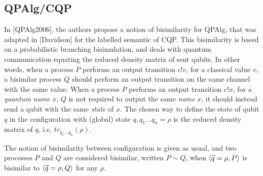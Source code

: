 \subsection{QPAlg/CQP}\label{lalire_bisimulation}

In [QPAlg2006], the authors propose a notion of bisimilarity for QPAlg, that was adapted in [Davidson] for the labelled semantic of CQP. This bisimilarity is based on a probabilistic branching bisimulation, and deals with quantum communication equating the reduced density matrix of sent qubits. In other words, when a process $P$ performs an output transition $c!v$, for a classical value $v$, a bisimilar process $Q$ should perform an output transition on the same channel with the same value. When a process $P$ performs an output transition $c!x$, for a \textit{quantum name} $x$, $Q$ is not required to output the same \textit{name} $x$, it should instead send a qubit with the same \textit{state} of $x$. The chosen way to define the state of qubit $q$ in the configuration with (global) state $q, q_1 \ldots q_n = \rho$ is the reduced density matrix of $q$, i.e. $tr_{q_1 \ldots q_n}(\rho)$.


The notion of bisimilarity between configuration is given as usual, and two processes $P$ and $Q$ are considered bisimilar, written $P \sim Q$, when $\langle\widetilde{q} = \rho, P\rangle$ is bisimilar to $\langle\widetilde{q} = \rho, Q\rangle$ for any $\rho$.


